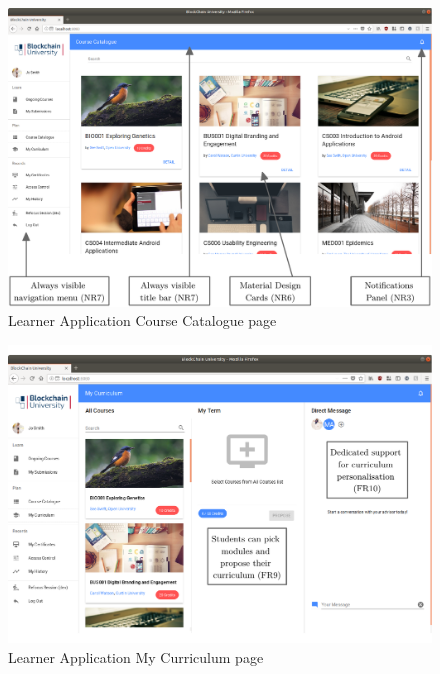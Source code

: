 \begin{figure}[!ht]
	\centering
	\includegraphics[width=1.05\textwidth]{Learner_allcourses}
	\caption[Learner Application Course Catalogue page]
	{Learner Application Course Catalogue page}
	\label{fig:Learner_allcourses}
\end{figure}

\begin{figure}[!ht]
	\centering
	\includegraphics[width=1.05\textwidth]{Learner_customiser}
	\caption[Learner Application My Curriculum page]
	{Learner Application My Curriculum page}
	\label{fig:Learner_customiser}
\end{figure}

